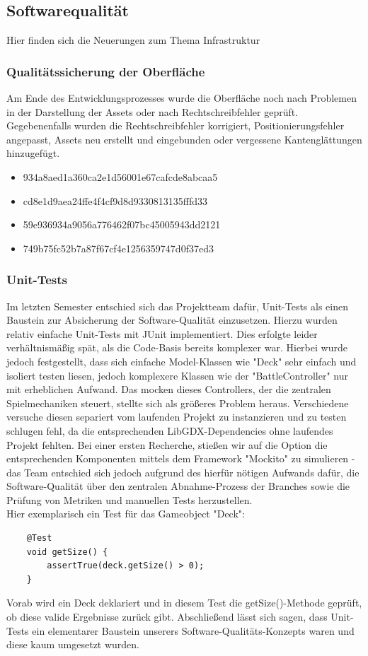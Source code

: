 \subsection{Softwarequalität}
Hier finden sich die Neuerungen zum Thema Infrastruktur

\subsubsection{Qualitätssicherung der Oberfläche}
Am Ende des Entwicklungsprozesses wurde die Oberfläche noch nach Problemen in der Darstellung der Assets oder nach Rechtschreibfehler geprüft. Gegebenenfalls wurden die Rechtschreibfehler korrigiert, Positionierungsfehler angepasst, Assets neu erstellt und eingebunden oder vergessene Kantenglättungen hinzugefügt. 
\begin{itemize}
\item 934a8aed1a360ca2e1d56001e67cafcde8abcaa5
\item cd8e1d9aea24ffe4f4cf9d8d9330813135fffd33
\item 59e936934a9056a776462f07bc45005943dd2121
\item 749b75fc52b7a87f67cf4e1256359747d0f37ed3
\end{itemize}

\subsubsection{Unit-Tests}
Im letzten Semester entschied sich das Projektteam dafür, Unit-Tests als einen Baustein zur Absicherung der Software-Qualität einzusetzen. Hierzu wurden relativ einfache Unit-Tests mit JUnit implementiert. Dies erfolgte leider verhältnismäßig spät, als die Code-Basis bereits komplexer war. Hierbei wurde jedoch festgestellt, dass sich einfache Model-Klassen wie "Deck" sehr einfach und isoliert testen liesen, jedoch komplexere Klassen wie der "BattleController" nur mit erheblichen Aufwand. Das mocken dieses Controllers, der die zentralen Spielmechaniken steuert, stellte sich als größeres Problem heraus. Verschiedene versuche diesen separiert vom laufenden Projekt zu instanzieren und zu testen schlugen fehl, da die entsprechenden LibGDX-Dependencies ohne laufendes Projekt fehlten. Bei einer ersten Recherche, stießen wir auf die Option die entsprechenden Komponenten mittels dem Framework "Mockito" zu simulieren - das Team entschied sich jedoch aufgrund des hierfür nötigen Aufwands dafür, die Software-Qualität über den zentralen Abnahme-Prozess der Branches sowie die Prüfung von Metriken und manuellen Tests herzustellen. \\
Hier exemplarisch ein Test für das Gameobject "Deck":
\begin{lstlisting}
    @Test
    void getSize() {
        assertTrue(deck.getSize() > 0);
    }
\end{lstlisting}
Vorab wird ein Deck deklariert und in diesem Test die getSize()-Methode geprüft, ob diese valide Ergebnisse zurück gibt. Abschließend lässt sich sagen, dass Unit-Tests ein elementarer Baustein unserers Software-Qualitäts-Konzepts waren und diese kaum umgesetzt wurden. 

